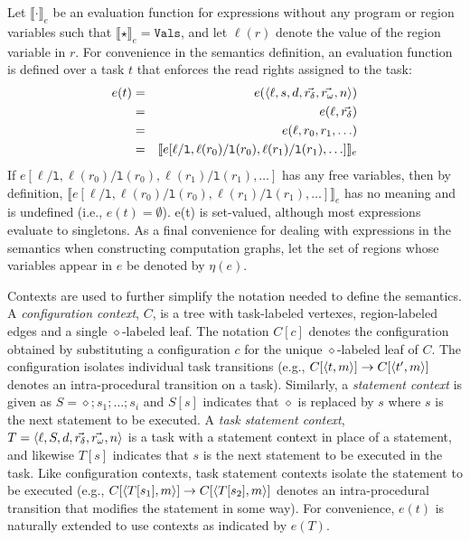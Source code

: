 Let $\llbracket \cdot \rrbracket_e$ be an evaluation function for expressions without any program or region variables such that $\llbracket \star \rrbracket_e = \texttt{Vals}$, and let $\ell(r)$ denote the value of the region variable in $r$. For convenience in the semantics definition, an evaluation function is defined over a task $t$ that enforces the read rights assigned to the task:
\begin{eqnarray*}
  e(t) &=& e(\langle \ell, s, d, \vec{r_\delta}, \vec{r_\omega}, n \rangle ) \\
  &=& e(\ell, \vec{r_\delta}) \\
  &=& e(\ell, r_0, r_1, \ldots) \\
  &=& \llbracket e[\ell / \texttt{l},\ell(r_0) / \texttt{l}(r_0), \ell(r_1) / \texttt{l}(r_1), \ldots]  \rrbracket_e
  \end{eqnarray*}
If $e[\ell / \texttt{l},\ell(r_0) / \texttt{l}(r_0), \ell(r_1) / \texttt{l}(r_1), \ldots]$ has any free variables, then by definition, $\llbracket e[\ell / \texttt{l},\ell(r_0) / \texttt{l}(r_0), \ell(r_1) / \texttt{l}(r_1), \ldots]  \rrbracket_e$ has no meaning and is undefined (i.e., $e(t) = \emptyset$). e(t) is set-valued, although most expressions evaluate to singletons. As a final convenience for dealing with expressions in the semantics when constructing computation graphs, let the set of regions whose variables appear in $e$ be denoted by $\eta(e)$. 

Contexts are used to further simplify the notation needed to define the semantics.  A \emph{configuration context}, $C$, is a tree with task-labeled vertexes, region-labeled edges and a single $\diamond$-labeled leaf. The notation $C[c]$ denotes the configuration obtained by substituting a configuration $c$ for the unique $\diamond$-labeled leaf of $C$. The configuration isolates individual task transitions (e.g., $C[\langle t,m \rangle ] \rightarrow C[\langle t^\prime,m \rangle ]$ denotes an intra-procedural transition on a task). Similarly, a \emph{statement context} is given as $S = \diamond ; s_1; \dots ;s_i$ and $S[s]$ indicates that $\diamond$ is replaced by $s$ where $s$ is the next statement to be executed. A \emph{task statement context}, $T = \langle \ell,  S, d, \vec{r_\delta}, \vec{r_\omega}, n \rangle $ is a task with a statement context in place of a statement, and likewise $T[s]$ indicates that $s$ is the next statement to be executed in the task. Like configuration contexts, task statement contexts isolate the statement to be executed (e.g., $C[\langle T[s_1],m \rangle ] \rightarrow C[\langle T[s_2],m \rangle ]$ denotes an intra-procedural transition that modifies the statement in some way). For convenience, $e(t)$ is naturally extended to use contexts as indicated by $e(T)$. 

